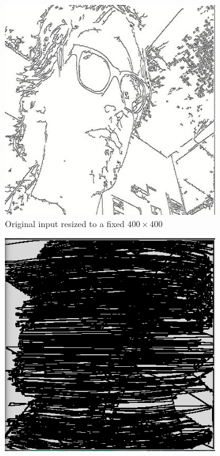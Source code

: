 \begin{figure}[t]
\caption{Simulated experiments of different segmentation neighborhood sizes}
\label{fig:simulating_experiments}
    \begin{subfigure}[t]{.15\textwidth}
        \includegraphics[width=\textwidth]{Images/original_input_resized_400x400.jpg}
        \caption{Original input resized to a fixed $400\times400$}
        \label{subfig:original}
    \end{subfigure}
    \begin{subfigure}[t]{.15\textwidth}
        \includegraphics[width=\textwidth]{Images/segmented_v1_3x3_neighborhood.png}

\end{subfigure}
\end{figure}
